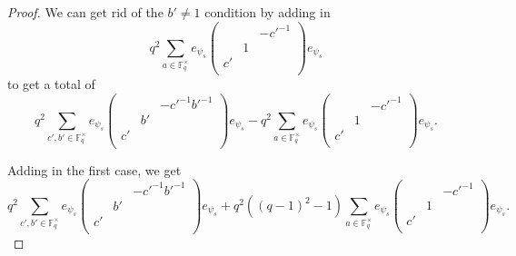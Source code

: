 \documentclass[12pt,reqno]{amsart}
\theoremstyle{definition}
\theoremstyle{remark}
\numberwithin{equation}{section}
\begin{document}
\begin{proof}
    We can get rid of the $b' \ne 1$ condition by adding in
    \begin{equation*}
        q^2 \sum_{a \in \mathbb{F}_q^\times}e_{\psi_s} \begin{pmatrix}
            & & -c'^{-1}\\
            & 1 & \\
            c' & &\\
        \end{pmatrix} e_{\psi_s}
    \end{equation*}
     to get a total of
     \begin{equation*}
        q^2 \sum_{c', b' \in \mathbb{F}_q^\times}e_{\psi_s} \begin{pmatrix}
            & & -c'^{-1}b'^{-1}\\
            & b' & \\
            c' & &\\
        \end{pmatrix} e_{\psi_s}-q^2 \sum_{a \in \mathbb{F}_q^\times}e_{\psi_s} \begin{pmatrix}
            & & -c'^{-1}\\
            & 1 & \\
            c' & &\\
        \end{pmatrix} e_{\psi_s}.
    \end{equation*}

    Adding in the first case, we get
    \begin{equation*}
        q^2 \sum_{c', b' \in \mathbb{F}_q^\times}e_{\psi_s} \begin{pmatrix}
            & & -c'^{-1}b'^{-1}\\
            & b' & \\
            c' & &\\
        \end{pmatrix} e_{\psi_s}+q^2((q-1)^2-1) \sum_{a \in \mathbb{F}_q^\times}e_{\psi_s} \begin{pmatrix}
            & & -c'^{-1}\\
            & 1 & \\
            c' & &\\
        \end{pmatrix} e_{\psi_s}.
    \end{equation*}
\end{proof}
\end{document}
